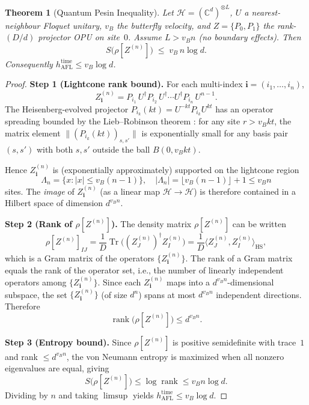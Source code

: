 \documentclass[12pt,a4paper]{article}
\newtheorem{theorem}{Theorem}[section]
\begin{document}
\begin{theorem}[Quantum Pesin Inequality]
\label{thm:pesin_ineq}
Let $\mathcal{H}=(\mathbb{C}^d)^{\otimes L}$, $U$ a nearest-neighbour
Floquet unitary, $v_B$ the butterfly velocity, and $Z=\{P_0,P_1\}$
the rank-$(D/d)$ projector OPU on site~$0$.  Assume $L > v_B n$ (no
boundary effects).  Then
\[
  S\!\bigl(\rho[Z^{(n)}]\bigr)\;\leq\;v_B\,n\log d.
\]
Consequently $h_{\mathrm{AFL}}^{\mathrm{time}}\leq v_B\log d$.
\end{theorem}
\begin{proof}[Proof]
\textbf{Step 1 (Lightcone rank bound).}
For each multi-index $\mathbf{i}=(i_1,\ldots,i_n)$,
\[
  Z^{(n)}_{\mathbf{i}} = P_{i_1}\,U^{\dagger}P_{i_2}\,U^{\dagger}\cdots
  U^{\dagger}P_{i_n}\,U^{n-1}.
\]
The Heisenberg-evolved projector $P_{i_k}(kt) = U^{-kt}P_{i_k}U^{kt}$
has an operator spreading bounded by the Lieb--Robinson
theorem \cite{lieb1972}: for any site $r>v_B kt$, the matrix element
$\|(P_{i_k}(kt))_{s,s'}\|$ is exponentially small for any basis pair $(s,s')$
with both $s,s'$ outside the ball $B(0,v_B kt)$.

Hence $Z^{(n)}_{\mathbf{i}}$ is (exponentially approximately) supported on
the lightcone region
\[
  \Lambda_n = \bigl\{x : |x|\leq v_B(n-1)\bigr\},
  \quad |\Lambda_n|= \lfloor v_B(n-1)\rfloor+1 \leq v_B n
\]
sites.  The \emph{image} of $Z^{(n)}_{\mathbf{i}}$ (as a linear map
$\mathcal{H}\to\mathcal{H}$) is therefore contained in a Hilbert space of
dimension $d^{v_B n}$.

\textbf{Step 2 (Rank of $\rho[Z^{(n)}]$).}
The density matrix $\rho[Z^{(n)}]$ can be written
\[
  \rho[Z^{(n)}]_{IJ}
  = \frac{1}{D}\operatorname{Tr}\bigl((Z^{(n)}_J)^{\dagger}Z^{(n)}_I\bigr)
  = \frac{1}{D}\langle Z^{(n)}_J, Z^{(n)}_I\rangle_{\mathrm{HS}},
\]
which is a Gram matrix of the operators $\{Z^{(n)}_{\mathbf{i}}\}$.
The rank of a Gram matrix equals the rank of the operator set, i.e.,
the number of linearly independent operators among $\{Z^{(n)}_{\mathbf{i}}\}$.
Since each $Z^{(n)}_{\mathbf{i}}$ maps into a $d^{v_B n}$-dimensional subspace,
the set $\{Z^{(n)}_{\mathbf{i}}\}$ (of size $d^n$) spans at most
$d^{v_B n}$ independent directions.  Therefore
\[
  \operatorname{rank}\bigl(\rho[Z^{(n)}]\bigr)\leq d^{v_B n}.
\]

\textbf{Step 3 (Entropy bound).}
Since $\rho[Z^{(n)}]$ is positive semidefinite with trace~$1$ and rank
$\leq d^{v_B n}$, the von Neumann entropy is maximized when all nonzero
eigenvalues are equal, giving
\[
  S\!\bigl(\rho[Z^{(n)}]\bigr)\leq\log\operatorname{rank}\leq v_B n\log d.
\]
Dividing by $n$ and taking $\limsup$ yields $h_{\mathrm{AFL}}^{\mathrm{time}}\leq v_B\log d$.
\end{proof}
\end{document}

